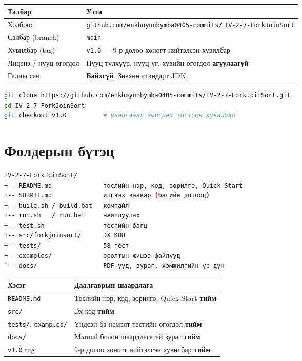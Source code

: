 \documentclass[11pt,a4paper]{article}
\begin{document}
\begin{center}
\small
\begin{tabular}{lL{10.0cm}}
\toprule
Талбар & Утга \\
\midrule
Холбоос & \texttt{\footnotesize github.com/enkhoyunbymba0405-commits/}
          \texttt{\footnotesize IV-2-7-ForkJoinSort} \\
Салбар (branch) & \texttt{main} \\
Хувилбар (tag) & \texttt{v1.0} --- 9-р долоо хоногт нийтэлсэн хувилбар \\
Лиценз / нууц өгөгдөл & Нууц түлхүүр, нууц үг, хувийн өгөгдөл \textbf{агуулаагүй} \\
Гадны сан & \textbf{Байхгүй}. Зөвхөн стандарт JDK. \\
\bottomrule
\end{tabular}
\end{center}

\begin{lstlisting}[language=bash]
git clone https://github.com/enkhoyunbymba0405-commits/IV-2-7-ForkJoinSort.git
cd IV-2-7-ForkJoinSort
git checkout v1.0          # үнэлгээнд ашиглах тогтсон хувилбар
\end{lstlisting}

\section{Фолдерын бүтэц}

\begin{lstlisting}[language=bash]
IV-2-7-ForkJoinSort/
+-- README.md              төслийн нэр, код, зорилго, Quick Start
+-- SUBMIT.md              илгээх заавар (багийн дотоод)
+-- build.sh / build.bat   компайл
+-- run.sh   / run.bat     ажиллуулах
+-- test.sh                тестийн багц
+-- src/forkjoinsort/      ЭХ КОД
+-- tests/                 58 тест
+-- examples/              оролтын жишээ файлууд
`-- docs/                  PDF-ууд, зураг, хэмжилтийн үр дүн
\end{lstlisting}

\begin{center}
\small
\begin{tabular}{lL{10.3cm}}
\toprule
Хэсэг & Даалгаврын шаардлага \\
\midrule
\texttt{README.md} & Төслийн нэр, код, зорилго, Quick Start \textbf{тийм} \\
\texttt{src/} & Эх код \textbf{тийм} \\
\texttt{tests/}, \texttt{examples/} & Үндсэн ба нэмэлт тестийн өгөгдөл \textbf{тийм} \\
\texttt{docs/} & Manual болон шаардлагатай зураг \textbf{тийм} \\
\texttt{v1.0} tag & 9-р долоо хоногт нийтэлсэн хувилбар \textbf{тийм} \\
\bottomrule
\end{tabular}
\end{center}
\end{document}
